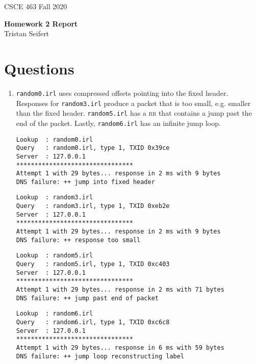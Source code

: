 \documentclass[11pt]{article}
\begin{document}
\newcommand{\answer}[1]{\mbox{~}}

{
\large  CSCE 463 \hfill Fall 2020\\
 \begin{center}
   \textbf{Homework 2 Report} \\
   Tristan Seifert \\
    \end{center}
}

\section{Questions}

\begin{enumerate}

\item {
\texttt{random0.irl} uses compressed offsets pointing into the fixed header. Responses for \texttt{random3.irl} produce a packet that is too small, e.g. smaller than the fixed header. \texttt{random5.irl} has a \textsc{rr} that contains a jump past the end of the packet. Lastly, \texttt{random6.irl} has an infinite jump loop.


\begin{lstlisting}[label=random0-trace,caption=Trace for \textit{random0.irl}]
Lookup  : random0.irl
Query   : random0.irl, type 1, TXID 0x39ce
Server  : 127.0.0.1
********************************
Attempt 1 with 29 bytes... response in 2 ms with 9 bytes
DNS failure: ++ jump into fixed header
\end{lstlisting}


\begin{lstlisting}[label=random3-trace,caption=Trace for \textit{random3.irl}]
Lookup  : random3.irl
Query   : random3.irl, type 1, TXID 0xeb2e
Server  : 127.0.0.1
********************************
Attempt 1 with 29 bytes... response in 2 ms with 9 bytes
DNS failure: ++ response too small
\end{lstlisting}


\begin{lstlisting}[label=random5-trace,caption=Trace for \textit{random5.irl}]
Lookup  : random5.irl
Query   : random5.irl, type 1, TXID 0xc403
Server  : 127.0.0.1
********************************
Attempt 1 with 29 bytes... response in 2 ms with 71 bytes
DNS failure: ++ jump past end of packet
\end{lstlisting}


\begin{lstlisting}[label=random6-trace,caption=Trace for \textit{random6.irl}]
Lookup  : random6.irl
Query   : random6.irl, type 1, TXID 0xc6c8
Server  : 127.0.0.1
********************************
Attempt 1 with 29 bytes... response in 6 ms with 59 bytes
DNS failure: ++ jump loop reconstructing label
\end{lstlisting}
}


\end{enumerate}
\end{document}
